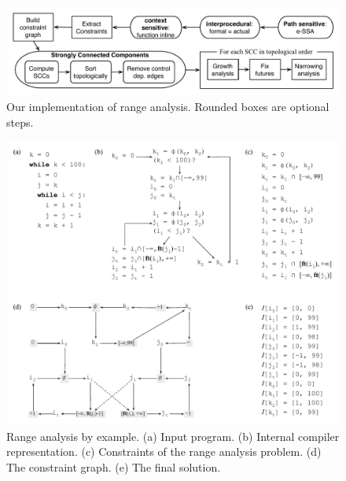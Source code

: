 \documentclass{paper}
\begin{document}
\begin{figure}[H]
\begin{center}
\includegraphics[width=\textwidth]{images/algorithm}
\end{center}
\caption{\label{fig:algorithm}
Our implementation of range analysis. Rounded boxes are optional steps.}
\end{figure}

\begin{figure}[H]
\begin{center}
\includegraphics[width=\textwidth]{images/overall_view}
\end{center}
\caption{\label{fig:overall_view}
Range analysis by example.
(a) Input program.
(b) Internal compiler representation.
(c) Constraints of the range analysis problem.
(d) The constraint graph.
(e) The final solution.}
\end{figure}
\end{document}
